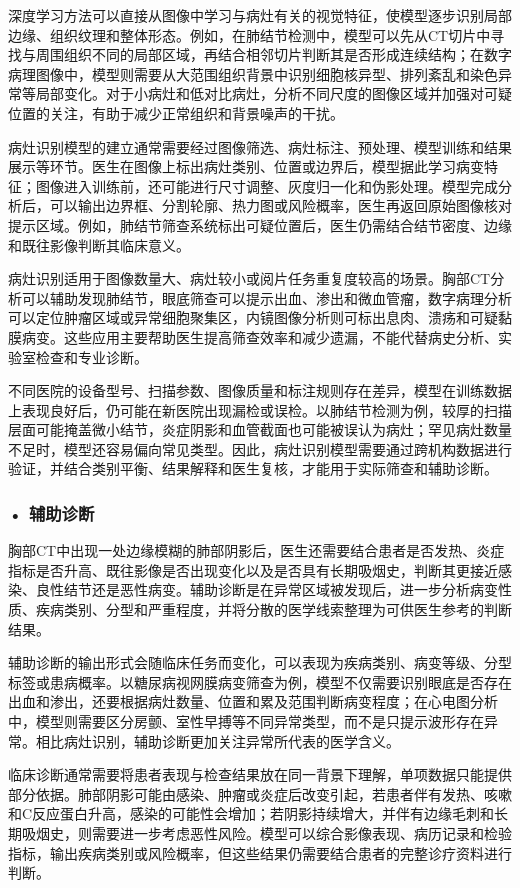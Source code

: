 深度学习方法可以直接从图像中学习与病灶有关的视觉特征，使模型逐步识别局部边缘、组织纹理和整体形态。例如，在肺结节检测中，模型可以先从CT切片中寻找与周围组织不同的局部区域，再结合相邻切片判断其是否形成连续结构；在数字病理图像中，模型则需要从大范围组织背景中识别细胞核异型、排列紊乱和染色异常等局部变化。对于小病灶和低对比病灶，分析不同尺度的图像区域并加强对可疑位置的关注，有助于减少正常组织和背景噪声的干扰。

病灶识别模型的建立通常需要经过图像筛选、病灶标注、预处理、模型训练和结果展示等环节。医生在图像上标出病灶类别、位置或边界后，模型据此学习病变特征；图像进入训练前，还可能进行尺寸调整、灰度归一化和伪影处理。模型完成分析后，可以输出边界框、分割轮廓、热力图或风险概率，医生再返回原始图像核对提示区域。例如，肺结节筛查系统标出可疑位置后，医生仍需结合结节密度、边缘和既往影像判断其临床意义。

病灶识别适用于图像数量大、病灶较小或阅片任务重复度较高的场景。胸部CT分析可以辅助发现肺结节，眼底筛查可以提示出血、渗出和微血管瘤，数字病理分析可以定位肿瘤区域或异常细胞聚集区，内镜图像分析则可标出息肉、溃疡和可疑黏膜病变。这些应用主要帮助医生提高筛查效率和减少遗漏，不能代替病史分析、实验室检查和专业诊断。

不同医院的设备型号、扫描参数、图像质量和标注规则存在差异，模型在训练数据上表现良好后，仍可能在新医院出现漏检或误检。以肺结节检测为例，较厚的扫描层面可能掩盖微小结节，炎症阴影和血管截面也可能被误认为病灶；罕见病灶数量不足时，模型还容易偏向常见类型。因此，病灶识别模型需要通过跨机构数据进行验证，并结合类别平衡、结果解释和医生复核，才能用于实际筛查和辅助诊断。


\subsubsection*{\textbf{• 辅助诊断}}

胸部CT中出现一处边缘模糊的肺部阴影后，医生还需要结合患者是否发热、炎症指标是否升高、既往影像是否出现变化以及是否具有长期吸烟史，判断其更接近感染、良性结节还是恶性病变。辅助诊断是在异常区域被发现后，进一步分析病变性质、疾病类别、分型和严重程度，并将分散的医学线索整理为可供医生参考的判断结果。

辅助诊断的输出形式会随临床任务而变化，可以表现为疾病类别、病变等级、分型标签或患病概率。以糖尿病视网膜病变筛查为例，模型不仅需要识别眼底是否存在出血和渗出，还要根据病灶数量、位置和累及范围判断病变程度；在心电图分析中，模型则需要区分房颤、室性早搏等不同异常类型，而不是只提示波形存在异常。相比病灶识别，辅助诊断更加关注异常所代表的医学含义。

临床诊断通常需要将患者表现与检查结果放在同一背景下理解，单项数据只能提供部分依据。肺部阴影可能由感染、肿瘤或炎症后改变引起，若患者伴有发热、咳嗽和C反应蛋白升高，感染的可能性会增加；若阴影持续增大，并伴有边缘毛刺和长期吸烟史，则需要进一步考虑恶性风险。模型可以综合影像表现、病历记录和检验指标，输出疾病类别或风险概率，但这些结果仍需要结合患者的完整诊疗资料进行判断。

